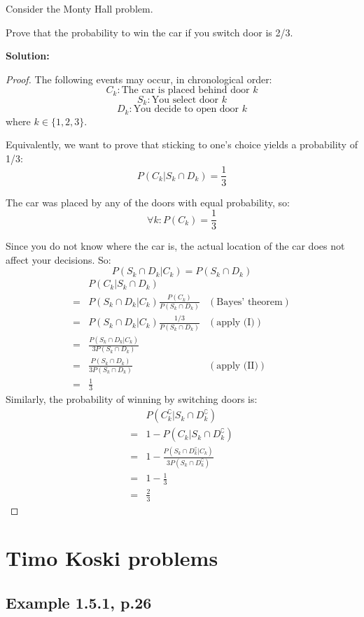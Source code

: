 \documentclass{article}
\begin{document}
Consider the Monty Hall problem.

Prove that the probability to win the car if you switch door is 2/3.

\textbf{Solution:}

\begin{proof}
The following events may occur, in chronological order:
\[C_k: \text{The car is placed behind door }k\]
\[S_k: \text{You select door }k\]
\[D_k: \text{You decide to open door }k\]
where \(k\in \{1,2,3\}\).

Equivalently, we want to prove that sticking to one's choice yields a probability of 1/3:
\[P(C_k|S_k \cap D_k)=\frac{1}{3}\]

The car was placed by any of the doors with equal probability, so:
\[\forall k: P(C_k)=\frac13\tag{I}\]

Since you do not know where the car is, the actual location of the car does not affect your decisions. So:
\[P(S_k\cap D_k|C_k)=P(S_k\cap D_k)\tag{II}\]
\begin{align*}
     & P(C_k|S_k\cap D_k) \\
    =& P(S_k\cap D_k|C_k)\frac{P(C_k)}{P(S_k\cap D_k)} & (\text{Bayes' theorem}) \\
    =& P(S_k\cap D_k|C_k)\frac{1/3}{P(S_k\cap D_k)} & (\text{apply (I)}) \\
    =& \frac{P(S_k\cap D_k|C_k)}{3P(S_k\cap D_k)} \\
    =& \frac{P(S_k\cap D_k)}{3P(S_k\cap D_k)} & (\text{apply (II)}) \\
    =& \frac{1}{3}
\end{align*}
Similarly, the probability of winning by switching doors is:
\begin{align*}
     & P(C_k^\complement|S_k\cap D_k^\complement) \\
    =& 1-P(C_k|S_k\cap D_k^\complement) \\
    =& 1-\frac{P(S_k\cap D_k^\complement|C_k)}{3P(S_k\cap D_k^\complement)} \\
    =& 1-\frac{1}{3} \\
    =& \frac{2}{3}
\end{align*}
\end{proof}

\section{Timo Koski problems}
\subsection{Example 1.5.1, p.26}
\end{document}
